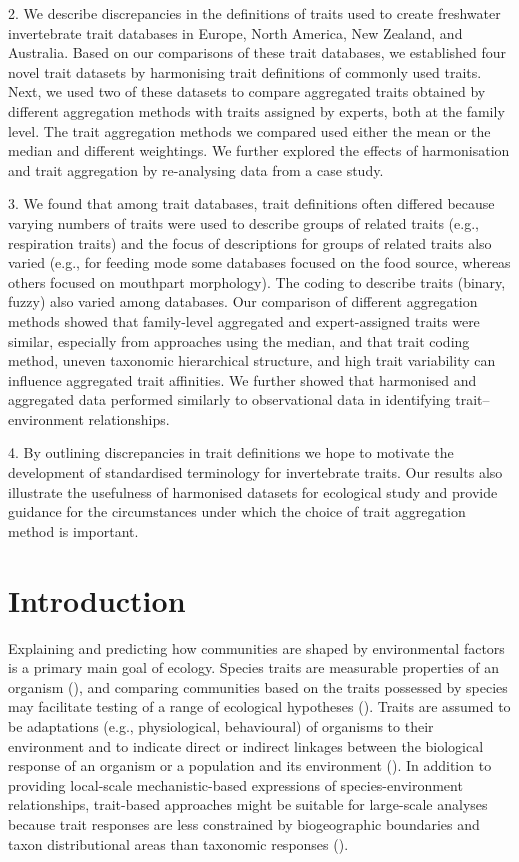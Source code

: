 \documentclass{article}
\begin{document}
2. We describe discrepancies in the definitions of traits used to create freshwater invertebrate trait databases in Europe, North America, New Zealand, and Australia. Based on our comparisons of these trait databases, we established four novel trait datasets by harmonising trait definitions of commonly used traits. Next, we used two of these datasets to compare aggregated traits obtained by different aggregation methods with traits assigned by experts, both at the family level. The trait aggregation methods we compared used either the mean or the median and different weightings. We further explored the effects of harmonisation and trait aggregation by re-analysing data from a case study.

3. We found that among trait databases, trait definitions often differed because varying numbers of traits were used to describe groups of related traits (e.g., respiration traits) and the focus of descriptions for groups of related traits also varied (e.g., for feeding mode some databases focused on the food source, whereas others focused on mouthpart morphology). The coding to describe traits (binary, fuzzy) also varied among databases. Our comparison of different aggregation methods showed that family-level aggregated and expert-assigned traits were similar, especially from approaches using the median, and that trait coding method, uneven taxonomic hierarchical structure, and high trait variability can influence aggregated trait affinities. We further showed that harmonised and aggregated data performed similarly to observational data in identifying trait–environment relationships.

4. By outlining discrepancies in trait definitions we hope to motivate the development of standardised terminology for invertebrate traits. Our results also illustrate the usefulness of harmonised datasets for ecological study and provide guidance for the circumstances under which the choice of trait aggregation method is important.


\newpage

\section*{Introduction}

Explaining and predicting how communities are shaped by environmental factors is a primary main goal of ecology. Species traits are measurable properties of an organism (\cite{mcgill_rebuilding_2006}), and comparing communities based on the traits possessed by species may facilitate testing of a range of ecological hypotheses (\cite{heino_jani_macroecological_2013}). Traits are assumed to be adaptations (e.g., physiological, behavioural) of organisms to their environment and to indicate direct or indirect linkages between the biological response of an organism or a population and its environment (\cite{southwood_habitat_1977, verberk_delivering_2013}).
In addition to providing local-scale mechanistic-based expressions of species-environment relationships, trait-based approaches might be suitable for large-scale analyses because trait responses are less constrained by biogeographic boundaries and taxon distributional areas than taxonomic responses (\cite{baird_toward_2011, bonada_taxonomic_2007}). 
\end{document}
